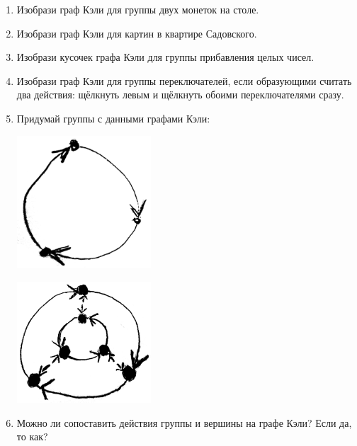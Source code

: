 \documentclass[12pt]{article} %
\begin{document}
\begin{enumerate}[start=11]
  \item Изобрази граф Кэли для группы двух монеток на столе.
  \item Изобрази граф Кэли для картин в квартире Садовского.
  \item Изобрази кусочек графа Кэли для группы прибавления целых чисел.
  \item Изобрази граф Кэли для группы переключателей, если образующими считать два действия: щёлкнуть левым и щёлкнуть обоими переключателями сразу.
  \item Придумай группы с данными графами Кэли:

  \begin{minipage}[c]{0.5\textwidth}
  \centering
          \includegraphics[width=5cm]{figure/c3b.png}
 \end{minipage}
 \begin{minipage}[c]{0.5\textwidth}
 \centering
         \includegraphics[width=5cm]{figure/s3b.png}
 \end{minipage}

  \item Можно ли сопоставить действия группы и вершины на графе Кэли? Если да, то как?
\end{enumerate}
\end{document}
